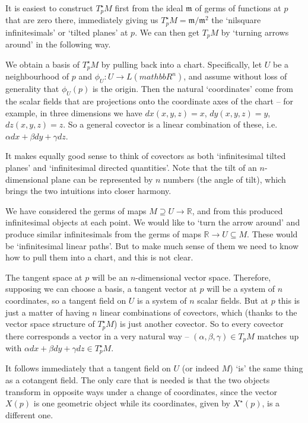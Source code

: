 \documentclass[oneside,english]{amsbook}
\numberwithin{section}{chapter}
\theoremstyle{plain}
\theoremstyle{definition}
\begin{document}
It is easiest to construct $T_p^\star M$ first from the ideal $\mathfrak{m}$ of germs of functions at $p$ that are zero there, immediately giving us $T_p^\star M = \mathfrak{m}/\mathfrak{m}^2$ the `nilsquare infinitesimals' or `tilted planes' at $p$. We can then get $T_p M$ by `turning arrows around' in the following way.

We obtain a basis of $T_p^\star M$ by pulling back into a chart. Specifically, let $U$ be a neighbourhood of $p$ and $\phi_U:U\to L(mathbb{R}^n)$, and assume without loss of generality that $\phi_U(p)$ is the origin. Then the natural `coordinates' come from the scalar fields that are projections onto the coordinate axes of the chart -- for example, in three dimensions we have $dx(x, y, z) = x$, $dy(x, y, z) = y$, $dz(x, y, z) = z$. So a general covector is a linear combination of these, i.e. $\alpha dx + \beta dy + \gamma dz$.

It makes equally good sense to think of covectors as both `infinitesimal tilted planes' and `infinitesimal directed quantities'. Note that the tilt of an $n$-dimensional plane can be represented by $n$ numbers (the angle of tilt), which brings the two intuitions into closer harmony.

We have considered the germs of maps $M\supseteq U\to \mathbb{R}$, and from this produced infinitesimal objects at each point. We would like to `turn the arrow around' and produce similar infinitesimals from the germs of maps $\mathbb{R}\to U\subseteq M$. These would be `infinitesimal linear paths'. But to make much sense of them we need to know how to pull them into a chart, and this is not clear.

The tangent space at $p$ will be an $n$-dimensional vector space. Therefore, supposing we can choose a basis, a tangent vector at $p$ will be a system of $n$ coordinates, so a tangent field on $U$ is a system of $n$ scalar fields. But at $p$ this is just a matter of having $n$ linear combinations of covectors, which (thanks to the vector space structure of $T_p^\star M$) is just another covector. So to every covector there corresponds a vector in a very natural way -- $(\alpha, \beta, \gamma)\in T_p M$ matches up with $\alpha dx + \beta dy + \gamma dz\in T_p^\star M$.

It follows immediately that a tangent field on $U$ (or indeed $M$) `is' the same thing as a cotangent field. The only care that is needed is that the two objects transform in opposite ways under a change of coordinates, since the vector $X(p)$ is one geometric object while its coordinates, given by $X^\star(p)$, is a different one.
\end{document}
